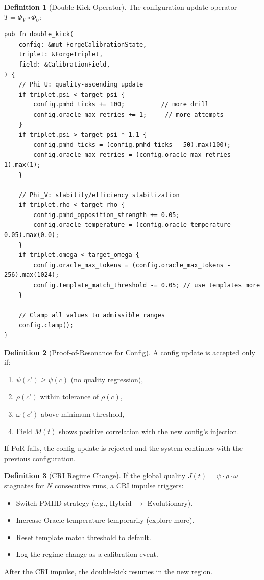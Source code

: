\documentclass[11pt,a4paper,twoside]{article}
\theoremstyle{definition}
\newtheorem{definition}{Definition}[section]
\theoremstyle{plain}
\theoremstyle{remark}
\begin{document}
\begin{definition}[Double-Kick Operator]\label{def:doublekick}
The configuration update operator $T = \Phi_V \circ \Phi_U$:
\begin{lstlisting}
pub fn double_kick(
    config: &mut ForgeCalibrationState,
    triplet: &ForgeTriplet,
    field: &CalibrationField,
) {
    // Phi_U: quality-ascending update
    if triplet.psi < target_psi {
        config.pmhd_ticks += 100;          // more drill
        config.oracle_max_retries += 1;     // more attempts
    }
    if triplet.psi > target_psi * 1.1 {
        config.pmhd_ticks = (config.pmhd_ticks - 50).max(100);
        config.oracle_max_retries = (config.oracle_max_retries - 1).max(1);
    }

    // Phi_V: stability/efficiency stabilization
    if triplet.rho < target_rho {
        config.pmhd_opposition_strength += 0.05;
        config.oracle_temperature = (config.oracle_temperature - 0.05).max(0.0);
    }
    if triplet.omega < target_omega {
        config.oracle_max_tokens = (config.oracle_max_tokens - 256).max(1024);
        config.template_match_threshold -= 0.05; // use templates more
    }

    // Clamp all values to admissible ranges
    config.clamp();
}
\end{lstlisting}
\end{definition}

\begin{definition}[Proof-of-Resonance for Config]\label{def:porcfg}
A config update is accepted only if:
\begin{enumerate}[nosep]
  \item $\psi(c') \ge \psi(c)$ (no quality regression),
  \item $\rho(c')$ within tolerance of $\rho(c)$,
  \item $\omega(c')$ above minimum threshold,
  \item Field $M(t)$ shows positive correlation with the new config's
        injection.
\end{enumerate}
If PoR fails, the config update is rejected and the system continues
with the previous configuration.
\end{definition}

\begin{definition}[CRI Regime Change]\label{def:cri}
If the global quality $J(t) = \psi \cdot \rho \cdot \omega$ stagnates
for $N$ consecutive runs, a CRI impulse triggers:
\begin{itemize}[nosep]
  \item Switch PMHD strategy (e.g., Hybrid $\to$ Evolutionary).
  \item Increase Oracle temperature temporarily (explore more).
  \item Reset template match threshold to default.
  \item Log the regime change as a calibration event.
\end{itemize}
After the CRI impulse, the double-kick resumes in the new region.
\end{definition}
\end{document}
